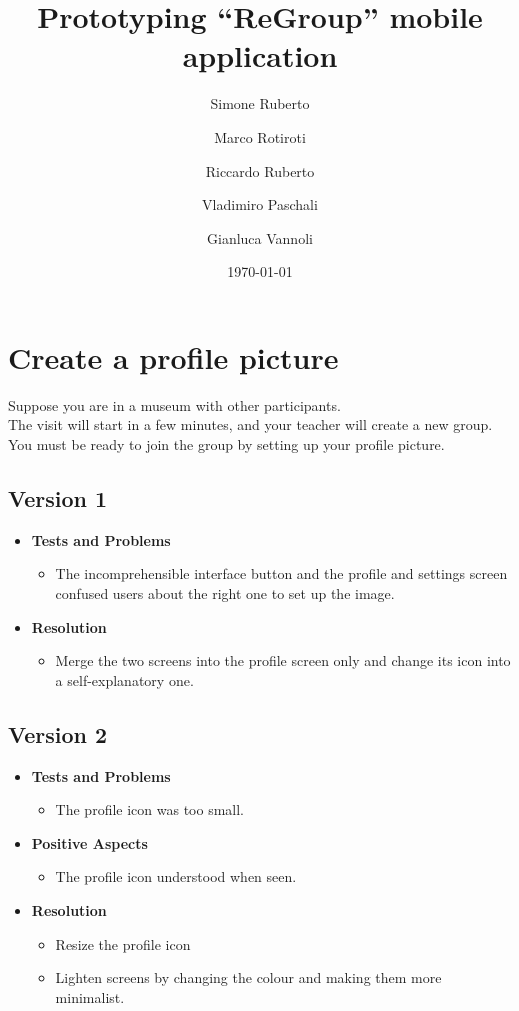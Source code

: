\documentclass[10pt,a4paper]{article}
\begin{document}
\title{Prototyping ``ReGroup'' mobile application}
\author[1]{Simone Ruberto}
\author[1]{Marco Rotiroti}
\author[1]{Riccardo Ruberto}
\author[1]{Vladimiro Paschali}
\author[1]{Gianluca Vannoli}

\date{\today}

\maketitle

\section*{Create a profile picture}
Suppose you are in a museum with other participants. \\
The visit will start in a few minutes, and your teacher will create a new group. \\
You must be ready to join the group by setting up your profile picture.
\subsection*{Version 1}
\begin{itemize}
    \item \textbf{Tests and Problems}
    \begin{itemize}
    \item The incomprehensible interface button and the profile and settings screen confused users about the right one to set up the image.
    \end{itemize}
    \item \textbf{Resolution}
    \begin{itemize}
        \item Merge the two screens into the profile screen only and change its icon into a self-explanatory one.
    \end{itemize}
\end{itemize}

\subsection*{Version 2}
\begin{itemize}
    \item \textbf{Tests and Problems}
    \begin{itemize}
        \item The profile icon was too small.  
    \end{itemize}
    \item \textbf{Positive Aspects}
    \begin{itemize}
        \item The profile icon understood when seen.
    \end{itemize}    
    \item \textbf{Resolution}
    \begin{itemize}
        \item Resize the profile icon
        \item Lighten screens by changing the colour and making them more minimalist.
    \end{itemize}
\end{itemize}
\end{document}

